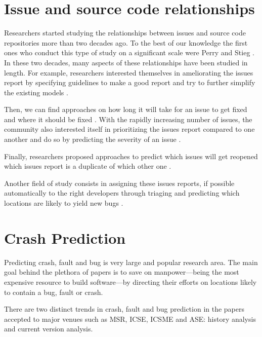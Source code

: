 \section{Issue and source code relationships\label{rel:issue-rela}}

Researchers started studying the relationships between issues and source code repositories more than two decades ago.
To the best of our knowledge the first ones who conduct this type of study on a significant scale were Perry and Stieg \cite{PerryDewayneE.1993}.
In these two decades, many aspects of these relationships have been studied in length.
For example, researchers  interested themselves in ameliorating the issues report by specifying guidelines to make a good report \cite{Bettenburg2008} and try to further simplify the existing models \cite{Herraiz2008}.

Then, we can find approaches on how long it will take for an issue to get fixed \cite{Bhattacharya2011,Zhang2013,Saha2014} and where it should be fixed \cite{Zhou2012,Kim2013a}.
With the rapidly increasing number of issues, the community also interested itself in prioritizing the issues report compared to one another \cite{Kim2011c} and do so by predicting the severity of an issue \cite{Lamkanfi2010}.

Finally, researchers proposed approaches to predict which issues will get reopened \cite{Zimmermann2012,Lo2013} which issues report is a duplicate of which other one \cite{Jalbert2008,Bettenburg2008a,Tian2012a}.

Another field of study consists in assigning these issues reports, if possible automatically to the right developers through triaging  \cite{Anvik2006,Jeong2009,Tamrawi2011a,Bortis2013}
and predicting which locations are likely to yield new bugs \cite{Kim2006,Kim2007}.

\section{Crash Prediction}

Predicting crash, fault and bug is very large and popular research area.
The main goal behind the plethora of papers is to save on manpower---being the most expensive resource to build software---by directing their efforts on locations likely to contain a bug, fault or crash.

There are two distinct trends in crash, fault and bug prediction in the papers accepted to major venues such as MSR, ICSE, ICSME and ASE:  history analysis and current version analysis.

